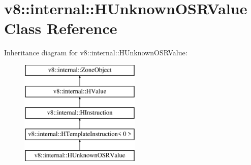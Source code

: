 \hypertarget{classv8_1_1internal_1_1_h_unknown_o_s_r_value}{}\section{v8\+:\+:internal\+:\+:H\+Unknown\+O\+S\+R\+Value Class Reference}
\label{classv8_1_1internal_1_1_h_unknown_o_s_r_value}
Inheritance diagram for v8\+:\+:internal\+:\+:H\+Unknown\+O\+S\+R\+Value\+:\begin{figure}[H]
\begin{center}
\leavevmode
\includegraphics[height=5.000000cm]{classv8_1_1internal_1_1_h_unknown_o_s_r_value}
\end{center}
\end{figure}
